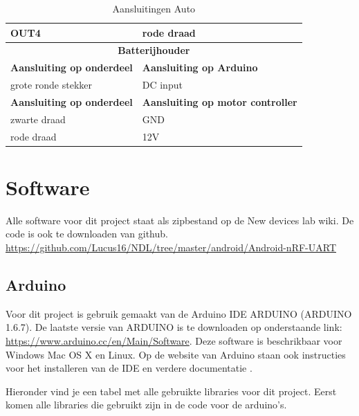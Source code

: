 \documentclass[12pt,a4paper]{article}
\begin{document}
\begin{table}[H]
\begin{tabularx}{\textwidth}{|X|X|}
			\hline OUT4 & rode draad \\
			\hline \multicolumn{2}{|c|}{\textbf{Batterijhouder}}\\	 
			\hline \textbf{Aansluiting op onderdeel} & \textbf{Aansluiting op Arduino} \\
			\hline grote ronde stekker & DC input \\
			\hline \textbf{Aansluiting op onderdeel} & \textbf{Aansluiting op motor controller} \\
			\hline zwarte draad & GND \\
			\hline rode draad & 12V \\		
			\hline		
		\end{tabularx} 
		\caption{Aansluitingen Auto}
		\label{tbl:Aansluitingen_auto}
	\end{table}

\section{Software}
Alle software voor dit project staat als zipbestand op de New devices lab wiki. De code is ook te downloaden van github.
\url{https://github.com/Lucus16/NDL/tree/master/android/Android-nRF-UART}

\subsection{Arduino}
Voor dit project is gebruik gemaakt van de Arduino IDE ARDUINO (ARDUINO 1.6.7). De laatste versie van ARDUINO is te downloaden op onderstaande link: \url{https://www.arduino.cc/en/Main/Software}. Deze software is beschrikbaar voor Windows Mac OS X en Linux. Op de website van Arduino staan ook instructies voor het installeren van de IDE en verdere documentatie \cite{ARDUINO_getting started}.

Hieronder vind je een tabel met alle gebruikte libraries voor dit project.
Eerst komen alle libraries die gebruikt zijn in de code voor de arduino's.
\end{document}
